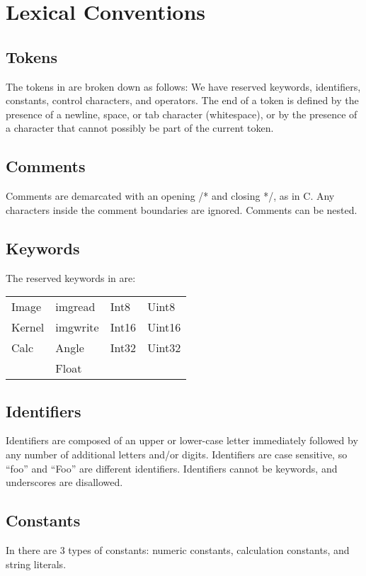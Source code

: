 \section{Lexical Conventions}
\label{sec:lex}

\subsection{Tokens}
\label{ssec:tokens}
The tokens in \sys{} are broken down as follows: We have reserved
keywords, identifiers, constants, control characters, and operators.
The end of a token is defined by the presence of a newline, space,
or tab character (whitespace), or by the presence of a character that
cannot possibly be part of the current token.

\subsection{Comments}
\label{ssec:comments}
Comments are demarcated with an opening /* and closing */, as in C.
Any characters inside the comment boundaries are ignored. Comments
can be nested.

\subsection{Keywords}
\label{ssec:keywords}
The reserved keywords in \sys{} are:
\begin{center}\begin{tabular}{l l l l}
Image & imgread & Int8 & Uint8\\
Kernel & imgwrite & Int16 & Uint16\\
Calc & Angle & Int32 & Uint32\\
 & Float & &
\end{tabular}\end{center}

\subsection{Identifiers}
\label{ssec:identifiers}
Identifiers are composed of an upper or lower-case letter immediately
followed by any number of additional letters and/or digits. Identifiers
are case sensitive, so ``foo'' and ``Foo'' are different identifiers.
Identifiers cannot be keywords, and underscores are disallowed.

\subsection{Constants}
\label{ssec:constants}
In \sys{} there are 3 types of constants: numeric constants,
calculation constants, and string literals.

